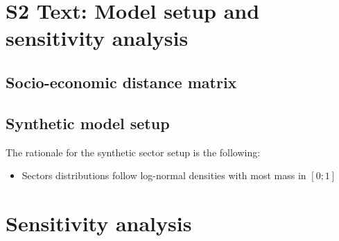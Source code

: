 

\vspace*{0.35in}
\justify

\section*{S2 Text: Model setup and sensitivity analysis}


\subsection*{Socio-economic distance matrix}




\subsection*{Synthetic model setup}

The rationale for the synthetic sector setup is the following:
\begin{itemize}
    \item Sectors distributions follow log-normal densities with most mass in $\left[0;1\right]$
\end{itemize}






\section*{Sensitivity analysis}



